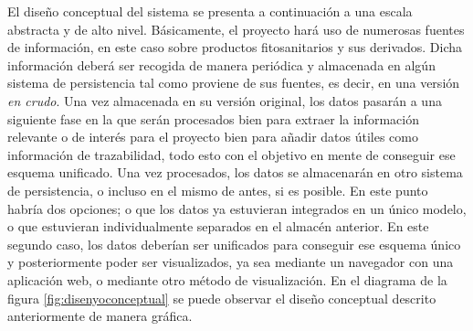 El diseño conceptual del sistema se presenta a continuación a una escala abstracta y de alto nivel. Básicamente, el proyecto hará uso de numerosas fuentes de información, en este caso sobre productos fitosanitarios y sus derivados. Dicha información deberá ser recogida de manera periódica y almacenada en algún sistema de persistencia tal como proviene de sus fuentes, es decir, en una versión \textit{en crudo}. Una vez almacenada en su versión original, los datos pasarán a una siguiente fase en la que serán procesados bien para extraer la información relevante o de interés para el proyecto bien para añadir datos útiles como información de trazabilidad, todo esto con el objetivo en mente de conseguir ese esquema unificado. Una vez procesados, los datos se almacenarán en otro sistema de persistencia, o incluso en el mismo de antes, si es posible. En este punto habría dos opciones; o que los datos ya estuvieran integrados en un único modelo, o que estuvieran individualmente separados en el almacén anterior. En este segundo caso, los datos deberían ser unificados para conseguir ese esquema único y posteriormente poder ser visualizados, ya sea mediante un navegador con una aplicación web, o mediante otro método de visualización. En el diagrama de la figura \ref{fig:disenyoconceptual} se puede observar el diseño conceptual descrito anteriormente de manera gráfica. 




